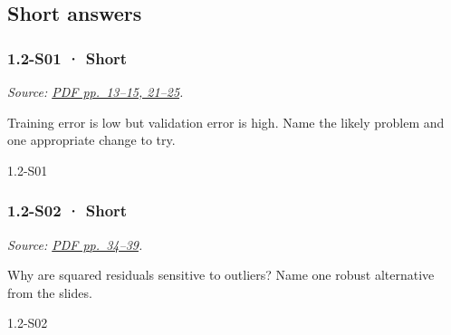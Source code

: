 \subsection{Short answers}\label{short-answers-1}

\noindent\begin{minipage}{\linewidth}

\subsubsection{1.2-S01 · Short}\label{s01-short-1}

\emph{Source:
\href{../Lecture\%20Slides/1.2.\%20Shallow\%20Learning.pdf\#page=13}{PDF
pp.~13--15, 21--25}.}

Training error is low but validation error is high. Name the likely
problem and one appropriate change to try.

\begin{solution}[20mm]{1.2-S01}

\end{solution}
\end{minipage}\par\medskip

\noindent\begin{minipage}{\linewidth}

\subsubsection{1.2-S02 · Short}\label{s02-short-1}

\emph{Source:
\href{../Lecture\%20Slides/1.2.\%20Shallow\%20Learning.pdf\#page=34}{PDF
pp.~34--39}.}

Why are squared residuals sensitive to outliers? Name one robust
alternative from the slides.

\begin{solution}[20mm]{1.2-S02}

\end{solution}
\end{minipage}\par\medskip

